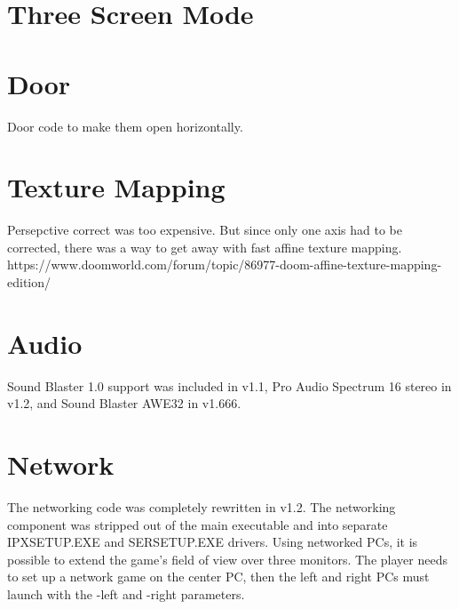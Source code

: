 \section{Three Screen Mode}
\section{Door}
Door code to make them open horizontally.
\section{Texture Mapping}
Persepctive correct was too expensive. But since only one axis had to be corrected, there was a way to get away with fast affine texture mapping.\\
https://www.doomworld.com/forum/topic/86977-doom-affine-texture-mapping-edition/\\
\par
\section{Audio}
Sound Blaster 1.0 support was included in v1.1, Pro Audio Spectrum 16 stereo in v1.2, and Sound Blaster AWE32 in v1.666.

\section{Network}
The networking code was completely rewritten in v1.2. The networking component was stripped out of the main executable and into separate IPXSETUP.EXE and SERSETUP.EXE drivers. Using networked PCs, it is possible to extend the game's field of view over three monitors. The player needs to set up a network game on the center PC, then the left and right PCs must launch with the -left and -right parameters. 